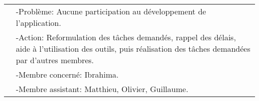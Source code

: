 \documentclass{../res/univ-projet}
\begin{document}
\begin{tabular}{| p{5cm} | p{2.5cm} | p{6.5cm} |}
		\cellcolor{lightgray}						   & \multicolumn{2}{p{9cm}|}{-Problème: Aucune participation au développement de l'application.} \\
		\cellcolor{lightgray}						   & \multicolumn{2}{p{9cm}|}{-Action: Reformulation des tâches demandés, rappel des délais, aide à l'utilisation des outils, puis réalisation des tâches demandées par d'autres membres.} \\
		\cellcolor{lightgray}						   & \multicolumn{2}{p{9cm}|}{-Membre concerné: Ibrahima.} \\
		\cellcolor{lightgray}						   & \multicolumn{2}{p{9cm}|}{-Membre assistant: Matthieu, Olivier, Guillaume.} \\ \cline{2-3}
	\end{tabular}
\end{document}
